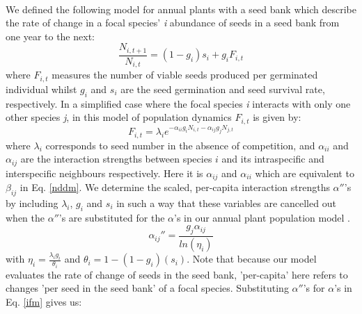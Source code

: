 \documentclass[a4,12pt]{article}
\begin{document}
        \paragraph{} 
        We defined the following model for annual plants with a seed bank \parencite{Levine2009, Mayfield2017, Bimler2018} which describe the rate of change in a focal species' \textit{i} abundance of seeds in a seed bank from one year to the next: 
            \begin{equation}
                \frac{N_{i, t+1}}{N_{i, t}} = \left( 1 - g_{i} \right) s_{i} + g_{i}F_{i, t}
                \label{ifm}
            \end{equation}
        where \(F_{i,t}\) measures the number of viable seeds produced per germinated individual whilst \(g_{i}\) and \(s_{i}\) are the seed germination and seed survival rate, respectively. In a simplified case where the focal species \textit{i} interacts with only one other species \textit{j}, in this model of population dynamics \(F_{i,t}\) is given by:
            \begin{equation}
                F_{i,t} = \lambda_{i} e^{- \alpha_{ii} g_{i} N_{i, t} -  \alpha_{ij} g_{j} N_{j, t} }
                \label{fecundity}   
            \end{equation}
        where \(\lambda_{i}\) corresponds to seed number in the absence of competition, and \(\alpha_{ii}\) and \(\alpha_{ij}\) are the interaction strengths between species \(i\) and its intraspecific and interspecific neighbours respectively. Here it is \(\alpha_{ij}\) and \(\alpha_{ii}\) which are equivalent to \(\beta_{ij}\) in Eq. \ref{nddm}. 
        We determine the scaled, per-capita interaction strengths ${\alpha}''$'s by including \(\lambda_{i}\), \(g_{i}\) and \(s_{i}\) in such a way that these variables are cancelled out when the ${\alpha}''$'s are substituted for the $\alpha$'s in our annual plant population model \parencite{Godoy2014, Bimler2018}. 
        \begin{equation}
            {\alpha_{ij}}'' = \frac{g_{j} \alpha_{ij}}{ln(\eta_{i})}
        \end{equation}
        with $\eta_{i} = \frac{\lambda_{i} g_{i}}{\theta_{i}}$ and $\theta_{i} = 1 - (1 - g_{i})(s_{i})$. %
        Note that because our model evaluates the rate of change of seeds in the seed bank, 'per-capita' here refers to changes 'per seed in the seed bank' of a focal species. Substituting ${\alpha}''$'s for $\alpha$'s in Eq. \ref{ifm} gives us: 
    
\end{document}
